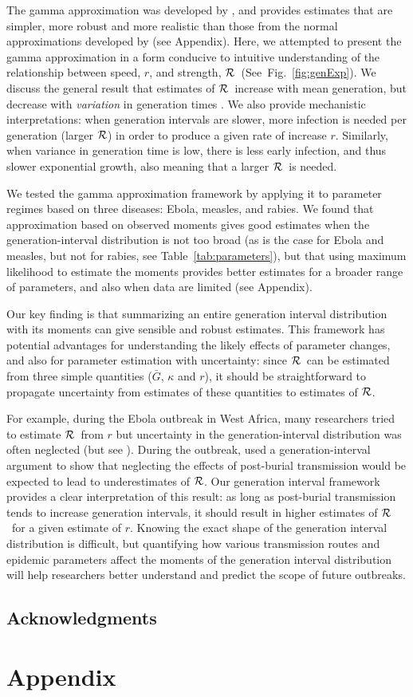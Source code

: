 \documentclass[12pt]{article}
\newcommand{\RR}{\ensuremath{{\cal R}}}
\newcommand{\fref}[1]{Fig.~\ref{fig:#1}}
\newcommand{\tref}[1]{Table~\ref{tab:#1}}
\begin{document}
The gamma approximation was developed by \cite{NishCast09}, and  
provides estimates that are simpler, more robust and more realistic than those from the normal approximations developed by \cite{WallLips07} (see Appendix).
Here, we attempted to present the gamma approximation in a form conducive to intuitive understanding of the relationship between speed, $r$, and strength, \RR\ (See~\fref{genExp}).
We discuss the general result that estimates of \RR\ increase with mean generation, but decrease with \emph{variation} in generation times \cite{WallLips07}. 
We also provide mechanistic interpretations: when generation intervals are slower, more infection is needed per generation (larger \RR)  in order to produce a given rate of increase $r$. Similarly, when variance in generation time is low, there is less early infection, and thus slower exponential growth, also meaning that a larger \RR\ is needed. 

We tested the gamma approximation framework by applying it to parameter regimes based on three diseases: Ebola, measles, and rabies. 
We found that approximation based on observed moments gives good estimates when the generation-interval distribution is not too broad (as is the case for Ebola and measles, but not for rabies, see \tref{parameters}), but that using maximum likelihood to estimate the moments provides better estimates for a broader range of parameters, and also when data are limited (see Appendix).

Our key finding is that summarizing an entire generation interval distribution with its moments can give sensible and robust estimates.
This framework has potential advantages for understanding the likely effects of parameter changes, and also for parameter estimation with uncertainty: since \RR\ can be estimated from three simple quantities ($\bar G$, $\kappa$ and $r$), it should be straightforward to propagate uncertainty from estimates of these quantities to estimates of \RR.

For example, during the Ebola outbreak in West Africa, many researchers tried to estimate \RR\ from $r$ \cite{Alth14, AylwBarb14, NishChow15, RiveLofg14, 
KingDome15} but uncertainty in the generation-interval distribution was often neglected (but see \cite{TaylDush16}).  
During the outbreak, \cite{WeitDush15} used a generation-interval argument to  show that neglecting the effects of post-burial transmission would be expected to lead to underestimates of \RR.
Our generation interval framework provides a clear interpretation of this result: as long as post-burial transmission tends to increase generation intervals, it should result in higher estimates of \RR\ for a given estimate of $r$.
Knowing the exact shape of the generation interval distribution is difficult, but quantifying how various transmission routes and epidemic parameters affect the moments of the generation interval distribution will help researchers better understand and predict the scope of future outbreaks.

\subsection*{Acknowledgments}

\printbibliography

\clearpage

\section{Appendix}


\end{document}
